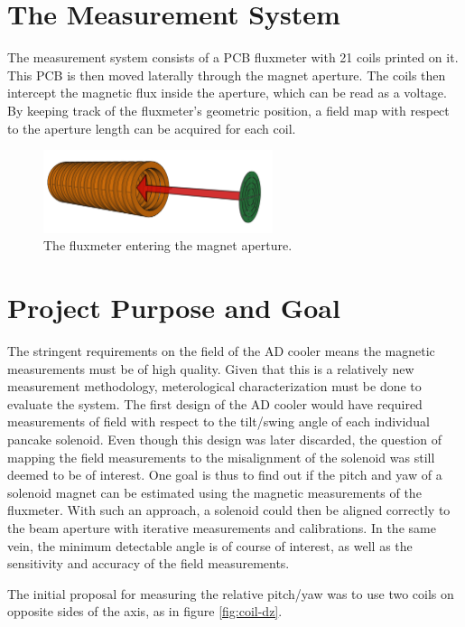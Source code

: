 \section{The Measurement System}
The measurement system consists of a PCB fluxmeter with 21 coils printed on it.
This PCB is then moved laterally through the magnet aperture.
The coils then intercept the magnetic flux inside the aperture,
which can be read as a voltage. By keeping track of the fluxmeter's
geometric position, a field map with respect to the aperture length
can be acquired for each coil.

\begin{figure}[!h]
    \centering
    \includegraphics[width=0.6\textwidth]{figs/pcbpath}
    \caption{The fluxmeter entering the magnet aperture.}
    \label{fig:pcbpath}
\end{figure}

\section{Project Purpose and Goal}
\label{sec:project_purpose}
The stringent requirements on the field of the AD cooler means the
magnetic measurements must be of high quality. Given that this is
a relatively new measurement methodology, meterological characterization
must be done to evaluate the system. The first design of the AD cooler
would have required measurements of field with respect to the tilt/swing
angle of each individual pancake solenoid. Even though this design was
later discarded, the question of mapping the field measurements to
the misalignment of the solenoid was still deemed to be of interest.
One goal is thus to find out if the pitch and yaw of a solenoid magnet
can be estimated using the magnetic measurements of the fluxmeter.
With such an approach, a solenoid could then be aligned correctly
to the beam aperture with iterative measurements and calibrations.
In the same vein, the minimum detectable angle is of course of interest,
as well as the sensitivity and accuracy of the field measurements.

The initial proposal for measuring the relative pitch/yaw was to
use two coils on opposite sides of the axis, as in figure \ref{fig:coil-dz}.

